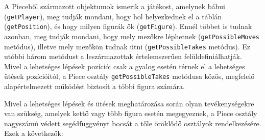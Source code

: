\documentclass[12pt, twoside]{report}
\begin{document}
A Pieceből származott objektumok ismerik a játékost, amelynek bábui ({\tt getPlayer}), meg tudják mondani, hogy hol helyezkednek el a táblán ({\tt getPosition}), és hogy milyen figurák ők ({\tt getFigure}). Ennél többet is tudnak azonban, meg tudják mondani, hogy mely mezőkre léphetnek ({\tt getPossibleMoves} metódus), illetve mely mezőkön tudnak ütni ({\tt getPossibleTakes} metódus). Ez utóbbi három metódust a leszármazottak értelemszerűen felüldefiniálhatják. Mivel a lehetséges lépések pozíciói csak a gyalog esetén térnek el a lehetséges ütések pozícióitól, a Piece osztály {\tt getPossibleTakes} metódusa közös, megfelelő alapértelmezett működést biztosít a többi figura számára.

Mivel a lehetséges lépések és ütések meghatározása során olyan tevékenységekre van szükség, amelyek kettő vagy több figura esetén megegyeznek, a Piece osztály nagyszámú védett segédfüggvényt bocsát a tőle öröklődő osztályok rendelkezésére. Ezek a következők:
\end{document}
